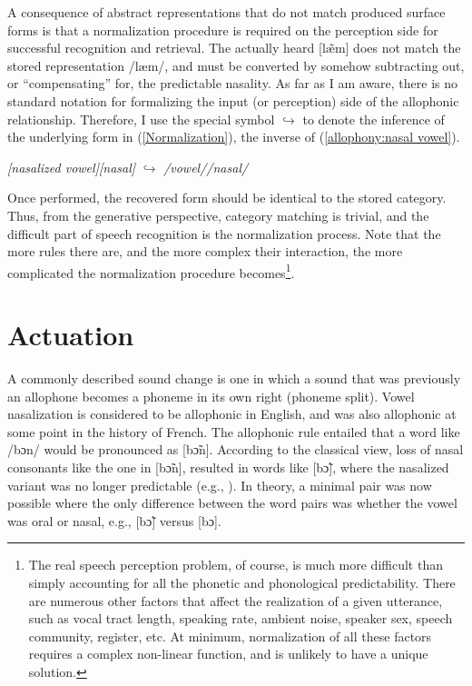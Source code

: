 A consequence of abstract representations that do not match produced
surface forms is that a normalization procedure is required on the
perception side for successful recognition and retrieval. The actually
heard {[læ̃m]} does not match the stored representation
{/læm/}, and must be converted by somehow subtracting out,
or “compensating” for, the predictable nasality. As far as I
am aware, there is no standard notation for formalizing the input
(or perception) side of the allophonic relationship. Therefore, I
use the special symbol $\hookrightarrow$ to denote the inference
of the underlying form in (\ref{Normalization}), the inverse of (\ref{allophony:nasal vowel}). 
\begin{covexamples}
\item \label{Normalization} \emph{{[}nasalized vowel{]}{[}nasal{]}}
$\hookrightarrow$ \emph{/vowel//nasal/}
\end{covexamples}
Once performed, the recovered form should be identical to the stored
category. Thus, from the generative perspective, category matching
is trivial, and the difficult part of speech recognition is the normalization
process. Note that the more rules there are, and the more complex
their interaction, the more complicated the normalization procedure
becomes\footnote{The real speech perception problem, of course, is much more difficult
than simply accounting for all the phonetic and phonological predictability.
There are numerous other factors that affect the realization of a
given utterance, such as vocal tract length, speaking rate, ambient
noise, speaker sex, speech community, register, etc. At minimum, normalization
of all these factors requires a complex non-linear function, and is
unlikely to have a unique solution. }. 

\section{\label{sec:Actuation-1}Actuation}

A commonly described sound change is one in which a sound that was
previously an allophone becomes a phoneme in its own right (phoneme
split). Vowel nasalization is considered to be allophonic in English,
and was also allophonic at some point in the history of French. The
allophonic rule entailed that a word like {/bɔn/} would be
pronounced as {[bɔ̃n]}. According to the classical view,
loss of nasal consonants like the one in {[bɔ̃n]}, resulted
in words like {[bɔ̃]}, where the nasalized variant was
no longer predictable (e.g., \citealt{Hajek1997a}). In theory, a
minimal pair was now possible where the only difference between the
word pairs was whether the vowel was oral or nasal, e.g., {[bɔ̃]}
versus {[bɔ]}. 

